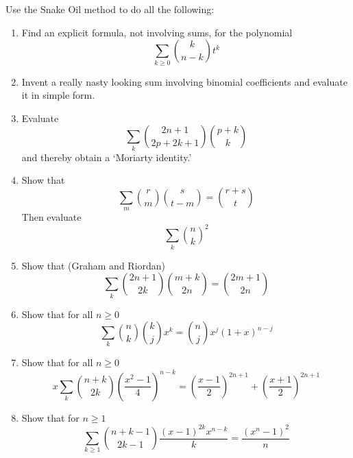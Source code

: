 \begin{exercise}
    Use the Snake Oil method to do all the following:
    \begin{enumerate}[label=(\alph*)]
        \item Find an explicit formula, not involving sums, for the polynomial
        \[
            \sum_{k\geq0} \binom{k}{n-k}t^k
        \]
        \item Invent a really nasty looking sum involving binomial coefficients and evaluate it in simple form.
        \item Evaluate 
        \[
            \sum_k \binom{2n+1}{2p+2k+1}\binom{p+k}{k}
        \]
        and thereby obtain a `Moriarty identity.'
        \item Show that 
        \[
            \sum_m \binom{r}{m}\binom{s}{t-m} = \binom{r+s}{t}
        \]
        Then evaluate
        \[
            \sum_k \binom{n}{k}^2
        \]
        \item Show that (Graham and Riordan)
        \[
            \sum_k \binom{2n+1}{2k}\binom{m+k}{2n} = \binom{2m+1}{2n}
        \]
        \item Show that for all $n\geq 0$
        \[
            \sum_k \binom{n}{k}\binom{k}{j}x^k = \binom{n}{j}x^j (1+x)^{n-j}
        \]
        \item Show that for all $n\geq 0$
        \[
            x\sum_k\binom{n+k}{2k}\left(\frac{x^2-1}{4}\right)^{n-k} = \left(\frac{x-1}{2}\right)^{2n+1} + \left(\frac{x+1}{2}\right)^{2n+1}
        \]
        \item Show that for $n\geq 1$
        \[
            \sum_{k\geq 1}\binom{n+k-1}{2k-1} \frac{(x-1)^{2k}x^{n-k}}{k} = \frac{(x^n-1)^2}{n}
        \]
    \end{enumerate}
\end{exercise}

